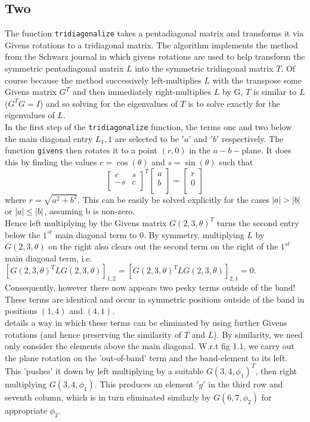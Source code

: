 \documentclass[paper=a4, fontsize=12pt]{scrartcl} %
\numberwithin{equation}{section}       %
\numberwithin{figure}{section}         %
\numberwithin{table}{section}          %
\begin{document}
\subsection{Two}
The function \texttt{tridiagonalize} takes a pentadiagonal matrix and transforms it via Givens rotations to a tridiagonal matrix. The algorithm implements the method from the Schwarz journal \cite{1} in which givens rotations are used to help transform the symmetric pentadiagonal matrix $L$ into the symmetric tridiagonal matrix $T$. Of course because the method successively left-multiplies $L$ with the transpose some Givens matrix $G^T$ and then immediately right-multiplies $L$ by G, $T$ is similar to $L$ ($G^TG = I$) and so solving for the eigenvalues of $T$ is to solve exactly for the eigenvalues of $L$. \\
\indent In the first step of the \texttt{tridiagonalize} function, the terms one and two below the main diagonal entry $L_1,1$ are selected to be $'a'$ and $'b'$ respectively. The function \texttt{givens} then rotates it to a point $(r,0)$ in the $a-b-$plane. It does this by finding the values $c = \cos(\theta)$ and $s = \sin(\theta)$ such that 
$$
\begin{bmatrix}
c & s \\
-s & c \\ 
\end{bmatrix} ^ T
\begin{bmatrix}
a \\
b \\ 
\end{bmatrix}
= 
\begin{bmatrix}
r \\
0 \\ 
\end{bmatrix}
$$
where $r = \sqrt{a^2 + b^2}$. This can be easily be solved explicitly for the cases $\abs{a} > \abs{b}$ or $\abs{a} \leq \abs{b}$, assuming b is non-zero. \\
Hence left multiplying by the Givens matrix $G(2,3,\theta)^T$ turns the second entry below the $1^{st}$ main diagonal term to 0. By symmetry, multiplying $L$ by $G(2,3,\theta)$ on the right also clears out the second term on the right of the $1^{st}$ main diagonal term, i.e. $[G(2,3,\theta)^TLG(2,3,\theta)]_{1,2} = [G(2,3,\theta)^TLG(2,3,\theta)]_{2,1} = 0$. Consequently, however there now appears two pesky terms outside of the band! These terms are identical and occur in symmetric positions outside of the band in positions $(1,4)$ and $(4,1)$.\\
\cite{1}  details a way in which these terms can be eliminated by using further Givens rotations (and hence preserving the similarity of $T$ and $L$). By similarity, we need only consider the elements above the main diagonal. W.r.t fig 1.1, we carry out the plane rotation on the 'out-of-band' term and the band-element to its left. This 'pushes' it down by left multiplying by a suitable $G(3,4,\phi_1)^T$, then right multiplying $G(3,4,\phi_1)$. This produces an element $'g'$ in the third row and seventh column, which is in turn eliminated similarly by $G(6,7,\phi_2)$ for appropriate $\phi_2$.
\end{document}
